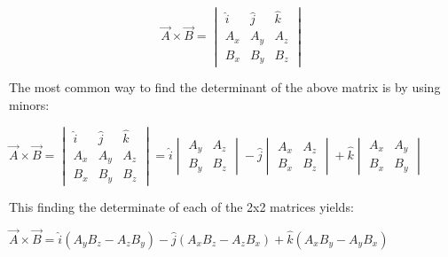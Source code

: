 \begin{mdframed}[backgroundcolor=orange!20!white]
\begin{equation}
 \vec{A} \times \vec{B} = 	\begin{vmatrix}
				\hat{i} & \hat{j} & \hat{k}\\
				A_x & A_y & A_z \\
				B_x & B_y & B_z 
				\end{vmatrix} 
				\label{equation:16}
\end{equation}
\end{mdframed}	

	
The most common way to find the determinant of the above matrix is by using minors:
\begin{center}
$
 \vec{A} \times \vec{B} = 	\begin{vmatrix}
	\hat{i} & \hat{j} & \hat{k}\\
	A_x & A_y & A_z \\
	B_x & B_y & B_z 
\end{vmatrix} 
= \hat{i} \begin{vmatrix}
	A_y & A_z \\
	B_y & B_z 
\end{vmatrix} - \hat{j} \begin{vmatrix}
A_x & A_z \\
B_x & B_z 
\end{vmatrix} + \hat{k} \begin{vmatrix}
A_x & A_y \\
B_x & B_y 
\end{vmatrix}
$
\end{center}

This finding the determinate of each of the 2x2 matrices yields:
\begin{center}
	$ \vec{A} \times \vec{B} = 	\hat{i} (A_y B_z - A_z B_y) - \hat{j}(A_x B_z - A_z B_x)+ \hat{k}(A_x B_y - A_y B_x)
$\end{center}



